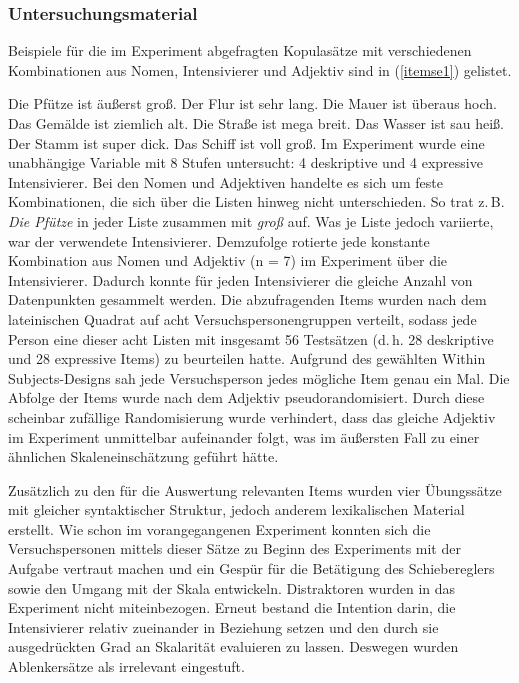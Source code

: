 \subsubsection{Untersuchungsmaterial}
Beispiele für die im Experiment abgefragten Kopulasätze mit verschiedenen Kombinationen aus Nomen, Intensivierer und Adjektiv sind in (\ref{itemse1}) gelistet.

\ea  \label{itemse1}
\ea Die Pfütze ist äußerst groß.
\ex Der Flur ist sehr lang.
\ex Die Mauer ist überaus hoch.
\ex Das Gemälde ist ziemlich alt.
\ex Die Straße ist mega breit.
\ex Das Wasser ist sau heiß.
\ex Der Stamm ist super dick.
\ex Das Schiff ist voll groß.
\z
\z
Im Experiment wurde eine unabhängige Variable mit 8 Stufen untersucht: 4 deskriptive und 4 expressive Intensivierer. Bei den Nomen und Adjektiven handelte es sich um feste Kombinationen, die sich über die Listen hinweg nicht unterschieden. So trat z.\,B. \textit{Die Pfütze} in jeder Liste zusammen mit \textit{groß} auf. Was je Liste jedoch variierte, war der verwendete Intensivierer. Demzufolge rotierte jede konstante Kombination aus Nomen und Adjektiv (n = 7) im Experiment über die Intensivierer. Dadurch konnte für jeden Intensivierer die gleiche Anzahl von Datenpunkten gesammelt werden. Die abzufragenden Items wurden nach dem lateinischen Quadrat auf acht Versuchspersonengruppen verteilt, sodass jede Person eine dieser acht Listen mit insgesamt 56 Testsätzen (d.\,h. 28 deskriptive und 28 expressive Items) zu beurteilen hatte. Aufgrund des gewählten Within Subjects-Designs sah jede Versuchsperson jedes mögliche Item genau ein Mal. Die Abfolge der Items wurde nach dem Adjektiv pseudorandomisiert. Durch diese scheinbar zufällige Randomisierung wurde verhindert, dass das gleiche Adjektiv im Experiment unmittelbar aufeinander folgt, was im äußersten Fall zu einer ähnlichen Skaleneinschätzung geführt hätte.


Zusätzlich zu den für die Auswertung relevanten Items wurden vier Übungssätze mit gleicher syntaktischer Struktur, jedoch anderem lexikalischen Material erstellt. Wie schon im vorangegangenen Experiment konnten sich die Versuchspersonen mittels dieser Sätze zu Beginn des Experiments mit der Aufgabe vertraut machen und ein Gespür für die Betätigung des Schiebereglers sowie den Umgang mit der Skala entwickeln. Distraktoren wurden in das Experiment nicht miteinbezogen. Erneut bestand die {Intention} darin, die Intensivierer relativ zueinander in Beziehung setzen und den durch sie ausgedrückten Grad an Skalarität evaluieren zu lassen. Deswegen wurden Ablenkersätze als irrelevant eingestuft.





